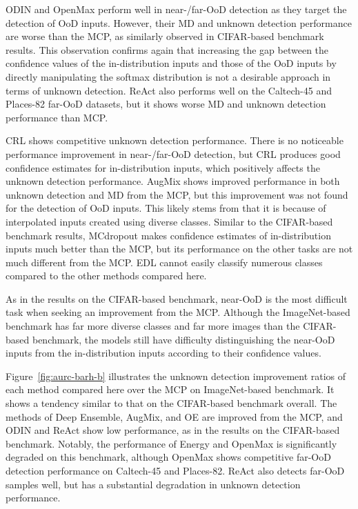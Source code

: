 \documentclass[preprint,12pt]{elsarticle}
\begin{document}
ODIN and OpenMax perform well in near-/far-OoD detection as they target the detection of OoD inputs. However, their MD and unknown detection performance are worse than the MCP, as similarly observed in CIFAR-based benchmark results. This observation confirms again that increasing the gap between the confidence values of the in-distribution inputs and those of the OoD inputs by directly manipulating the softmax distribution is not a desirable approach in terms of unknown detection. ReAct also performs well on the Caltech-45 and Places-82 far-OoD datasets, but it shows worse MD and unknown detection performance than MCP.

CRL shows competitive unknown detection performance. There is no noticeable performance improvement in near-/far-OoD detection, but CRL produces good confidence estimates for in-distribution inputs, which positively affects the unknown detection performance.
AugMix shows improved performance in both unknown detection and MD from the MCP, but this improvement was not found for the detection of OoD inputs. This likely stems from that it is because of interpolated inputs created using diverse classes. 
Similar to the CIFAR-based benchmark results, MCdropout makes confidence estimates of in-distribution inputs much better than the MCP, but its performance on the other tasks are not much different from the MCP. EDL cannot easily classify numerous classes compared to the other methods compared here.

As in the results on the CIFAR-based benchmark, near-OoD is the most difficult task when seeking an improvement from the MCP. Although the ImageNet-based benchmark has far more diverse classes and far more images than the CIFAR-based benchmark, the models still have difficulty distinguishing the near-OoD inputs from the in-distribution inputs according to their confidence values.

Figure~\ref{fig:aurc-barh-b} illustrates the unknown detection improvement ratios of each method compared here over the MCP on ImageNet-based benchmark. It shows a tendency similar to that on the CIFAR-based benchmark overall. The methods of Deep Ensemble, AugMix, and OE are improved from the MCP, and ODIN and ReAct show low performance, as in the results on the CIFAR-based benchmark. Notably, the performance of Energy and OpenMax is significantly degraded on this benchmark, although OpenMax shows competitive far-OoD detection performance on Caltech-45 and Places-82. ReAct also detects far-OoD samples well, but has a substantial degradation in unknown detection performance.
\end{document}
